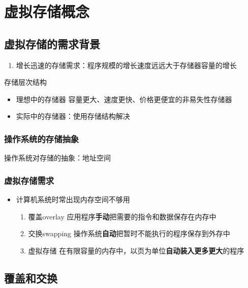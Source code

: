 \chapter{虚拟存储概念}
\section{虚拟存储的需求背景}
\begin{enumerate}
	\item 增长迅速的存储需求：程序规模的增长速度远远大于存储器容量的增长
\end{enumerate}
存储层次结构
\begin{itemize}
	\item 理想中的存储器
	\subitem 容量更大、速度更快、价格更便宜的非易失性存储器
	\item 实际中的存储器：使用存储结构解决
\end{itemize}
\subsection{操作系统的存储抽象}
操作系统对存储的抽象：地址空间
\subsection{虚拟存储需求}
\begin{itemize}
	\item 计算机系统时常出现内存空间不够用
	\begin{enumerate}
		\item 覆盖overlay
		\subitem 应用程序\textbf{手动}把需要的指令和数据保存在内存中
		\item 交换swapping
		\subitem 操作系统\textbf{自动}把暂时不能执行的程序保存到外存中
		\item 虚拟存储
		\subitem 在有限容量的内存中，以页为单位\textbf{自动装入更多更大}的程序
	\end{enumerate}
\end{itemize}

\section{覆盖和交换}
